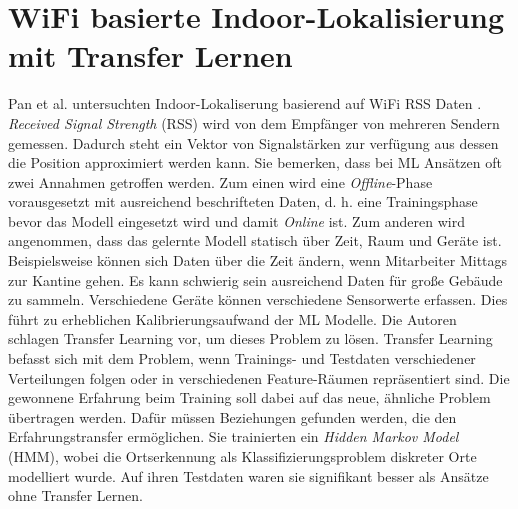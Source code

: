 \section{WiFi basierte Indoor-Lokalisierung mit Transfer Lernen}
Pan et al. untersuchten Indoor-Lokaliserung basierend auf WiFi RSS Daten \cite{pan2008transfer}.
\textit{Received Signal Strength} (RSS) wird von dem Empfänger von mehreren Sendern gemessen.
Dadurch steht ein Vektor von Signalstärken zur verfügung aus dessen die Position approximiert werden kann.
\newline
\newline
Sie bemerken, dass bei ML Ansätzen oft zwei Annahmen getroffen werden.
Zum einen wird eine \textit{Offline}-Phase vorausgesetzt mit ausreichend beschrifteten Daten,
d. h. eine Trainingsphase bevor das Modell eingesetzt wird und damit \textit{Online} ist.
Zum anderen wird angenommen, dass das gelernte Modell statisch über Zeit, Raum und Geräte ist.
\newline
\newline
Beispielsweise können sich Daten über die Zeit ändern, wenn Mitarbeiter Mittags zur Kantine gehen.
Es kann schwierig sein ausreichend Daten für große Gebäude zu sammeln.
Verschiedene Geräte können verschiedene Sensorwerte erfassen.
Dies führt zu erheblichen Kalibrierungsaufwand der ML Modelle.
\newline
\newline
Die Autoren schlagen Transfer Learning vor, um dieses Problem zu lösen.
Transfer Learning befasst sich mit dem Problem, wenn Trainings- und Testdaten verschiedener Verteilungen folgen oder in verschiedenen Feature-Räumen repräsentiert sind.
Die gewonnene Erfahrung beim Training soll dabei auf das neue, ähnliche Problem übertragen werden.
Dafür müssen Beziehungen gefunden werden, die den Erfahrungstransfer ermöglichen.
\newline
\newline
Sie trainierten ein \textit{Hidden Markov Model} (HMM), wobei die Ortserkennung als Klassifizierungsproblem diskreter Orte modelliert wurde.
Auf ihren Testdaten waren sie signifikant besser als Ansätze ohne Transfer Lernen.
